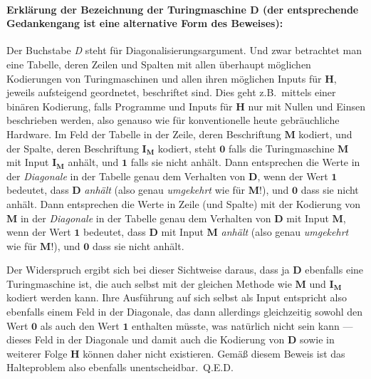 \paragraph{Erkl\"{a}rung der Bezeichnung der Turingmaschine $\mathbf{D}$ (der entsprechende Gedankengang ist eine alternative Form des Beweises):} Der Buchstabe \emph{D} steht f\"{u}r Diagonalisierungsargument. Und zwar betrachtet man eine Tabelle, deren Zeilen und Spalten mit allen \"{u}berhaupt m\"{o}glichen Kodierungen von Turingmaschinen und allen ihren m\"{o}glichen Inputs f\"{u}r $\mathbf{H}$, je\-weils aufsteigend geordnetet, beschriftet sind. Dies geht z.B.\ mittels einer bin\"{a}ren Kodierung, falls Programme und Inputs f\"{u}r $\mathbf{H}$ nur mit Nullen und Einsen beschrieben werden, also genauso wie f\"{u}r konventionelle heute gebr\"{a}uchliche Hardware. Im Feld der Tabelle in der Zeile, deren Beschriftung $\mathbf{M}$ kodiert, und der Spalte, deren Beschriftung $\mathbf{I_M}$ kodiert, steht $\mathbf{0}$ falls die Turingmaschine $\mathbf{M}$ mit Input $\mathbf{I_M}$ anh\"{a}lt, und $\mathbf{1}$ falls sie nicht anh\"{a}lt. Dann entsprechen die Werte in der \emph{Diagonale} in der Tabelle genau dem Verhalten von $\mathbf{D}$, wenn der Wert $\mathbf{1}$ bedeutet, dass $\mathbf{D}$ \emph{anh\"{a}lt} (also genau \emph{umgekehrt} wie f\"{u}r $\mathbf{M}$!), und $\mathbf{0}$ dass sie nicht anh\"{a}lt. Dann entsprechen die Werte in Zeile (und Spalte) mit der Kodierung von $\mathbf{M}$ in der \emph{Diagonale} in der Tabelle genau dem Verhalten von $\mathbf{D}$ mit Input $\mathbf{M}$, wenn der Wert $\mathbf{1}$ bedeutet, dass $\mathbf{D}$ mit Input $\mathbf{M}$ \emph{anh\"{a}lt} (also genau \emph{umgekehrt} wie f\"{u}r $\mathbf{M}$!), und $\mathbf{0}$ dass sie nicht anh\"{a}lt.

Der Widerspruch ergibt sich bei dieser Sichtweise daraus, dass ja $\mathbf{D}$ ebenfalls eine Tu\-ringmaschine ist, die auch selbst mit der gleichen Methode wie $\mathbf{M}$ und $\mathbf{I_M}$ kodiert werden kann. Ihre Ausf\"{u}hrung auf sich selbst als Input entspricht also ebenfalls einem Feld in der Diagonale, das dann allerdings gleichzeitig sowohl den Wert $\mathbf{0}$ als auch den Wert $\mathbf{1}$ enthalten m\"{u}sste, was nat\"{u}rlich nicht sein kann --- dieses Feld in der Diagonale und damit auch die Kodierung von $\mathbf{D}$ sowie in weiterer Folge $\mathbf{H}$ k\"{o}nnen daher nicht existieren. Gem\"{a}{\ss} diesem Beweis ist das Halteproblem also ebenfalls unentscheidbar.~Q.E.D.

